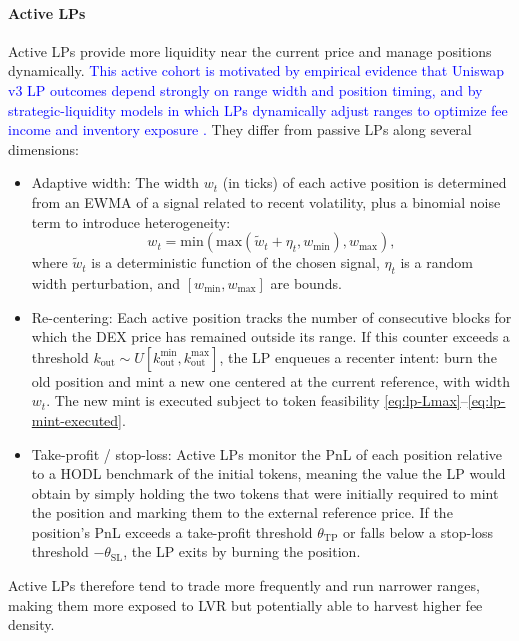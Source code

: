 \documentclass[11pt]{article}
\begin{document}
\paragraph{Active LPs}
Active LPs provide more liquidity near the current price and manage positions dynamically. \textcolor{blue}{This active cohort is motivated by empirical evidence that Uniswap v3 LP outcomes depend strongly on range width and position timing, and by strategic-liquidity models in which LPs dynamically adjust ranges to optimize fee income and inventory exposure \cite{heimbach2022,fan2023}.} They differ
from passive LPs along several dimensions:
\begin{itemize}[leftmargin=*]
  \item Adaptive width: The width $w_t$ (in ticks) of each active position is determined from an
  EWMA of a signal related to recent volatility, plus a binomial noise term to introduce heterogeneity:
  \begin{equation}
    w_t = \mathrm{min}\left(\mathrm{max}(\tilde w_t + \eta_t,w_{\min}),w_{\max}\right),
    \label{eq:active-width}
  \end{equation}
  where $\tilde w_t$ is a deterministic function of the chosen signal, $\eta_t$ is a random width
  perturbation, and $[w_{\min},w_{\max}]$ are bounds.
  \item Re-centering: Each active position tracks the number of consecutive blocks for which the
  DEX price has remained outside its range. If this counter exceeds a threshold
  $k_{\mathrm{out}} \sim U[k^{\min}_{\mathrm{out}},k^{\max}_{\mathrm{out}}]$, the LP enqueues a recenter intent:
  burn the old position and mint a new one centered at the current reference, with width $w_t$.
  The new mint is executed subject to token feasibility \eqref{eq:lp-Lmax}--\eqref{eq:lp-mint-executed}.
  \item Take-profit / stop-loss: Active LPs monitor the PnL of each position relative to a HODL
  benchmark of the initial tokens, meaning the value the LP would obtain by simply holding the two tokens that were initially required to mint the position and marking them to the external reference price. If the position's PnL exceeds a take-profit threshold
  $\theta_{\mathrm{TP}}$ or falls below a stop-loss threshold $-\theta_{\mathrm{SL}}$, the LP exits by burning
  the position.
\end{itemize}
Active LPs therefore tend to trade more frequently and run narrower ranges, making them more exposed to
LVR but potentially able to harvest higher fee density.
\end{document}
